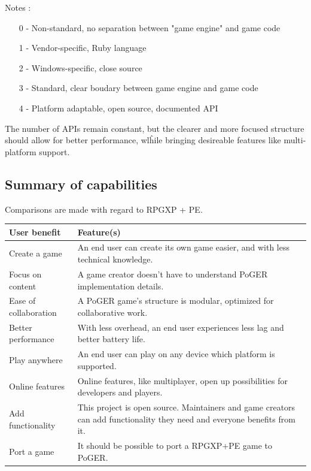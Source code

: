 \documentclass[11pt]{article}
\begin{document}
Notes :
\begin{itemize}
	\item[0] - Non-standard, no separation between "game engine" and game code
	\item[1] - Vendor-specific, Ruby language
	\item[2] - Windows-specific, close source
	\item[3] - Standard, clear boudary between game engine and game code
	\item[4] - Platform adaptable, open source, documented API
\end{itemize}

The number of APIs remain constant, but the clearer and more focused structure should allow for better performance, wlĥile bringing desireable features like multi-platform support.


\subsection{Summary of capabilities}

Comparisons are made with regard to RPGXP + PE.

\begin{center}
	\begin{tabular}{|L{.25\textwidth}|L{.7\textwidth}|}
		\hline
		\textbf{User benefit} & \textbf{Feature(s)} \\
		\hline
		Create a game & An end user can create its own game easier, and with less technical knowledge. \\
		\hline
		Focus on content & A game creator doesn't have to understand PoGER implementation details. \\
		\hline
		Ease of collaboration & A PoGER game's structure is modular, optimized for collaborative work. \\
		\hline
		Better performance & With less overhead, an end user experiences less lag and better battery life. \\
		\hline
		Play anywhere & An end user can play on any device which platform is supported. \\
		\hline
		Online features & Online features, like multiplayer, open up possibilities for developers and players. \\
		\hline
		Add functionality & This project is open source. Maintainers and game creators can add functionality they need and everyone benefits from it. \\
		\hline
		Port a game & It should be possible to port a RPGXP+PE game to PoGER. \\
		\hline
	\end{tabular}
\end{center}
\end{document}
